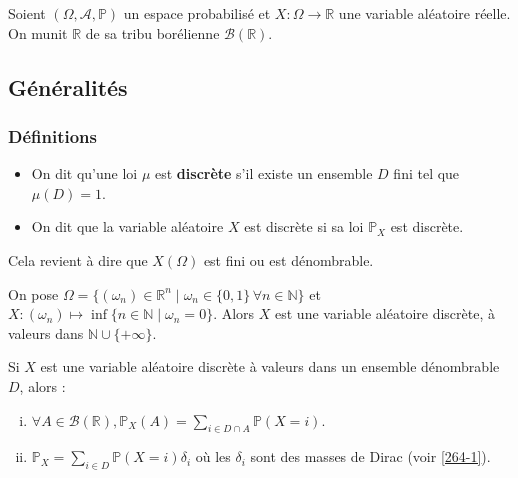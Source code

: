 




	Soient $(\Omega, \mathcal{A}, \mathbb{P})$ un espace probabilisé et $X : \Omega \rightarrow \mathbb{R}$ une variable aléatoire réelle. On munit $\mathbb{R}$ de sa tribu borélienne $\mathcal{B}(\mathbb{R})$.

	\subsection{Généralités}

	\subsubsection{Définitions}


	\begin{definition}
		\begin{itemize}
			\item On dit qu'une loi $\mu$ est \textbf{discrète} s'il existe un ensemble $D$ fini tel que $\mu(D) = 1$.
			\item On dit que la variable aléatoire $X$ est discrète si sa loi $\mathbb{P}_X$ est discrète.
		\end{itemize}
	\end{definition}


	\begin{remark}
		Cela revient à dire que $X(\Omega)$ est fini ou est dénombrable.
	\end{remark}

	\begin{example}
		On pose $\Omega = \{ (\omega_n) \in \mathbb{R}^n \mid \omega_n \in \{ 0,1 \} \, \forall n \in \mathbb{N} \}$ et $X : (\omega_n) \mapsto \inf \{ n \in \mathbb{N} \mid \omega_n = 0 \}$. Alors $X$ est une variable aléatoire discrète, à valeurs dans $\mathbb{N} \cup \{ +\infty \}$.
	\end{example}


	\begin{proposition}
		Si $X$ est une variable aléatoire discrète à valeurs dans un ensemble dénombrable $D$, alors :
		\begin{enumerate}[(i)]
			\item $\forall A \in \mathcal{B}(\mathbb{R}), \mathbb{P}_X(A) = \sum_{i \in D \cap A} \mathbb{P}(X=i)$.
			\item $\mathbb{P}_X = \sum_{i \in D} \mathbb{P}(X=i) \delta_i$ où les $\delta_i$ sont des masses de Dirac (voir \cref{264-1}).
		\end{enumerate}
	\end{proposition}

